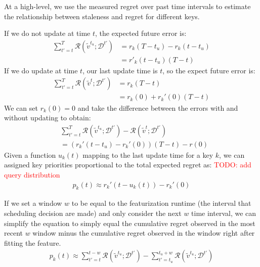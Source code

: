 At a high-level, we use the measured regret over past time intervals to estimate the relationship between staleness and regret for different keys. 


If we do not update at time $t$, the expected future error is: 
\begin{align}
   \sum_{t'=t}^T\mathcal{R}(\tilde{v}^{t_u}; \mathcal{D}^{t'}) &= r_k(T-t_u) - r_k(t-t_u) \\
   &= r'_k(t-t_u)(T-t)
\end{align}
If we do update at time $t$, our last update time is $t$, so the expect future error is: 
\begin{align}
\sum_{t'=t}^T\mathcal{R}(\tilde{v}^{t}; \mathcal{D}^{t'}) &= r_k(T-t) \\
&= r_k(0) + r_k'(0)(T-t)
\end{align}
We can set $r_k(0)=0$ and take the difference between the errors with and without updating to obtain: 
\begin{align}
&\sum_{t'=t}^T\mathcal{R}(\tilde{v}^{t_u}; \mathcal{D}^{t'}) - \mathcal{R}(\tilde{v}^{t}; \mathcal{D}^{t'}) \\
&= 
    \left(r_k'(t-t_u) - r_k'(0)\right)(T-t) - r(0)
\end{align}
Given a function $u_k(t)$ mapping to the last update time for a key $k$, we can assigned key priorities proportional to the total expected regret as: \textcolor{red}{TODO: add query distribution}
\begin{align}
    p_k(t) \approx r_k'(t-u_k(t)) - r_k'(0) 
\end{align}

If we set a window $w$ to be equal to the featurization runtime (the interval that scheduling decision are made) and only consider the next $w$ time interval, we can simplify the equation to simply equal the cumulative regret observed in the most recent $w$ window minus the cumulative regret observed in the window right after fitting the feature. 
\begin{align}
    p_k(t) \approx \sum_{t'=t}^{t- w} \mathcal{R}(\tilde{v}^{t_u}; \mathcal{D}^{t'}) - \sum_{t'=t_u}^{t_u+ w} \mathcal{R}(\tilde{v}^{t_u}; \mathcal{D}^{t'})
\end{align}





